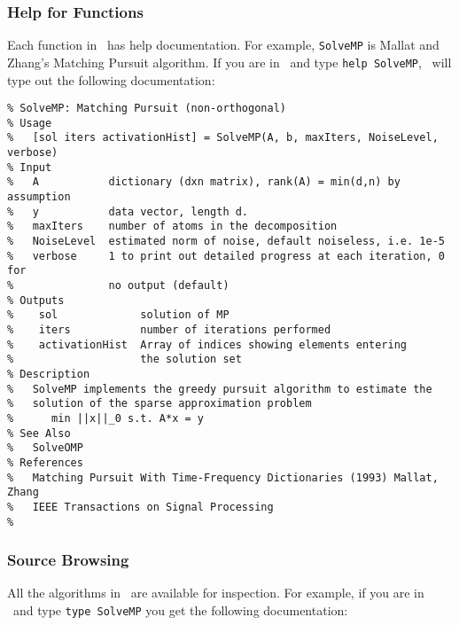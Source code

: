 \documentclass{article}
\begin{document}
\subsubsection{Help for Functions}

Each function in \WaveLab\ has help documentation.  For example,
{\tt SolveMP} is Mallat and Zhang's Matching Pursuit algorithm. If
you are in \Matlab\ and type {\tt help SolveMP}, \Matlab\ will type
out the following documentation:

\begin{verbatim}
% SolveMP: Matching Pursuit (non-orthogonal)
% Usage
%   [sol iters activationHist] = SolveMP(A, b, maxIters, NoiseLevel, verbose)
% Input
%   A           dictionary (dxn matrix), rank(A) = min(d,n) by assumption
%   y           data vector, length d.
%   maxIters    number of atoms in the decomposition
%   NoiseLevel  estimated norm of noise, default noiseless, i.e. 1e-5
%   verbose     1 to print out detailed progress at each iteration, 0 for
%               no output (default)
% Outputs
%    sol             solution of MP
%    iters           number of iterations performed
%    activationHist  Array of indices showing elements entering
%                    the solution set
% Description
%   SolveMP implements the greedy pursuit algorithm to estimate the
%   solution of the sparse approximation problem
%      min ||x||_0 s.t. A*x = y
% See Also
%   SolveOMP
% References
%   Matching Pursuit With Time-Frequency Dictionaries (1993) Mallat, Zhang
%   IEEE Transactions on Signal Processing
%
\end{verbatim}

\subsubsection{Source Browsing}

All the algorithms in \WaveLab\ are available for inspection. For
example, if you are in \Matlab\ and type {\tt type SolveMP} you get
the following documentation:
\end{document}
